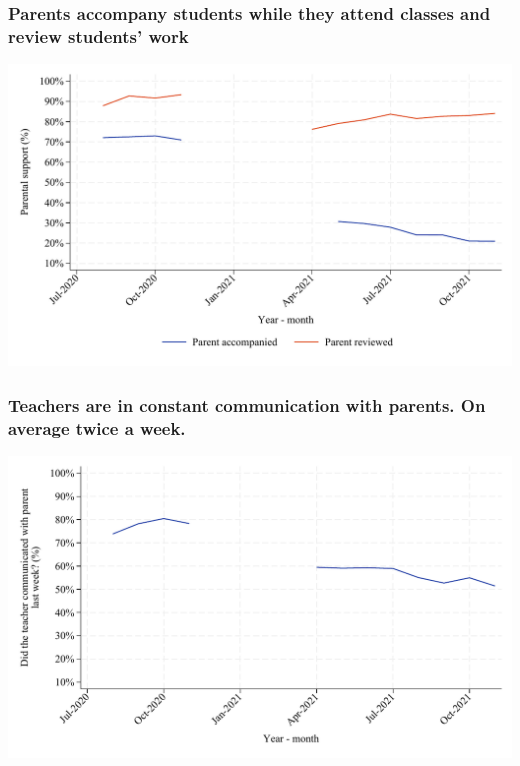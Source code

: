 \documentclass{beamer}
\begin{document}
\begin{frame}
    \label{frame:parental_support}
    \frametitle{Parents accompany students while they attend classes and review students' work}
               \includegraphics[width=\textwidth]{./FIGURES/Descriptive/SER_parent_elm.pdf}    
    
\end{frame}


\begin{frame}
    \label{frame:teacher_com}
    \frametitle{Teachers are in constant communication with parents. On average twice a week.}
               \includegraphics[width=\textwidth]{./FIGURES/Descriptive/SER_teacher_com_elm.pdf}    
    
\end{frame}
\end{document}
